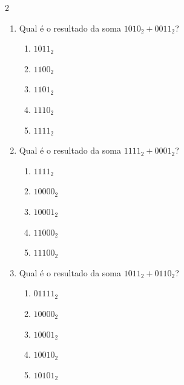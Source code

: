 \documentclass[a4paper,12pt]{article}
\begin{document}
\begin{multicols}{2}
\raggedcolumns

\begin{enumerate}[leftmargin=*]


\item Qual é o resultado da soma
$1010_2 + 0011_2$?

\begin{enumerate}[label=(\Alph*)]
    \item $1011_2$
    \item $1100_2$
    \item $1101_2$
    \item $1110_2$
    \item $1111_2$
\end{enumerate}

\vspace{0.2cm}


\item Qual é o resultado da soma
$1111_2 + 0001_2$?

\begin{enumerate}[label=(\Alph*)]
    \item $1111_2$
    \item $10000_2$
    \item $10001_2$
    \item $11000_2$
    \item $11100_2$
\end{enumerate}

\vspace{0.2cm}


\item Qual é o resultado da soma
$1011_2 + 0110_2$?

\begin{enumerate}[label=(\Alph*)]
    \item $01111_2$
    \item $10000_2$
    \item $10001_2$
    \item $10010_2$
    \item $10101_2$
\end{enumerate}

\vspace{0.2cm}




\end{enumerate}
\end{multicols}
\end{document}
